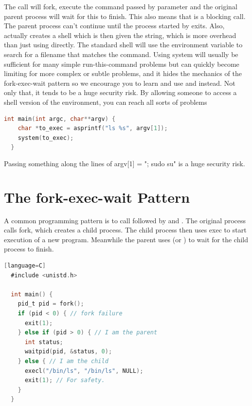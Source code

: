 \begin{itemize}
The  call will fork, execute the command passed by parameter and the original parent process will wait for this to finish.
This also means that  is a blocking call.
The parent process can't continue until the process started by  exits.
Also,  actually creates a shell which is then given the string, which is more overhead than just using  directly.
The standard shell will use the  environment variable to search for a filename that matches the command.
Using system will usually be sufficient for many simple run-this-command problems but can quickly become limiting for more complex or subtle problems, and it hides the mechanics of the fork-exec-wait pattern so we encourage you to learn and use   and  instead.
Not only that, it tends to be a huge security risk.
By allowing someone to access a shell version of the environment, you can reach all sorts of problems

\begin{lstlisting}[language=C]
  int main(int argc, char**argv) {
    char *to_exec = asprintf("ls %s", argv[1]);
    system(to_exec);
  }
\end{lstlisting}

Passing something along the lines of argv[1] = "; sudo su" is a huge security risk.

\section{The fork-exec-wait Pattern}

A common programming pattern is to call  followed by  and .
The original process calls fork, which creates a child process.
The child process then uses exec to start execution of a new program.
Meanwhile the parent uses  (or ) to wait for the child process to finish.

\begin{lstlisting}[language=C][language=C]
  #include <unistd.h>

  int main() {
    pid_t pid = fork();
    if (pid < 0) { // fork failure
      exit(1);
    } else if (pid > 0) { // I am the parent
      int status;
      waitpid(pid, &status, 0);
    } else { // I am the child
      execl("/bin/ls", "/bin/ls", NULL);
      exit(1); // For safety.
    }
  }
\end{lstlisting}


\end{itemize}
